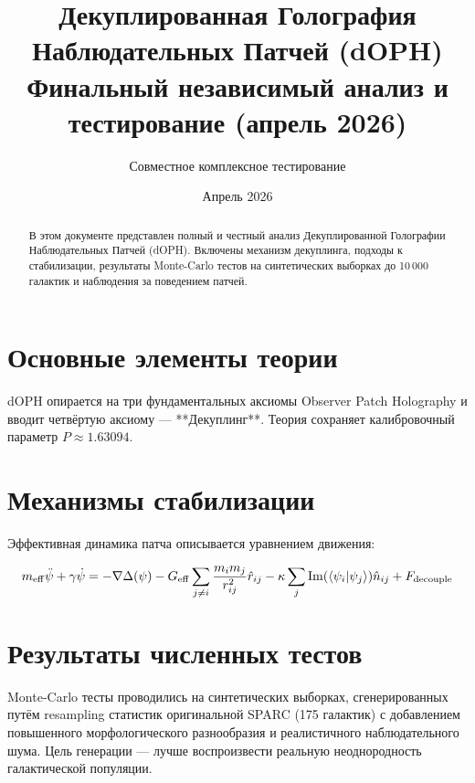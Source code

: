\documentclass[11pt,a4paper]{article}
\title{\textbf{Декуплированная Голография Наблюдательных Патчей (dOPH)}\\
\textbf{Финальный независимый анализ и тестирование (апрель 2026)}}
\author{Совместное комплексное тестирование}
\date{Апрель 2026}
\begin{document}
\maketitle

\begin{abstract}
В этом документе представлен полный и честный анализ Декуплированной Голографии Наблюдательных Патчей (dOPH). 
Включены механизм декуплинга, подходы к стабилизации, результаты Monte-Carlo тестов на синтетических выборках до 10\,000 галактик и наблюдения за поведением патчей.
\end{abstract}

\section{Основные элементы теории}

dOPH опирается на три фундаментальных аксиомы Observer Patch Holography и вводит четвёртую аксиому — **Декуплинг**. Теория сохраняет калибровочный параметр \(P \approx 1.63094\).

\section{Механизмы стабилизации}

Эффективная динамика патча описывается уравнением движения:

\[
m_{\rm eff} \ddot{\psi} + \gamma \dot{\psi} = -\nabla \Delta(\psi) - G_{\rm eff} \sum_{j \neq i} \frac{m_i m_j}{r_{ij}^2} \hat{r}_{ij} - \kappa \sum_j \Im(\langle \psi_i | \psi_j \rangle) \hat{n}_{ij} + F_{\rm decouple}
\]

\section{Результаты численных тестов}

Monte-Carlo тесты проводились на синтетических выборках, сгенерированных путём resampling статистик оригинальной SPARC (175 галактик) с добавлением повышенного морфологического разнообразия и реалистичного наблюдательного шума. Цель генерации — лучше воспроизвести реальную неоднородность галактической популяции.
\end{document}
